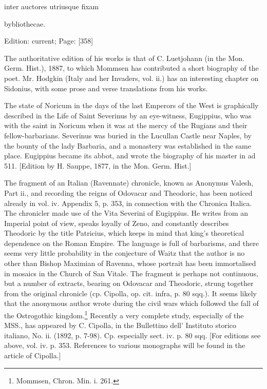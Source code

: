 inter auctores utriusque fixam

bybliothecae.

Edition: current; Page: [358]

The authoritative edition of his works is that of C. Luetjohann (in the Mon. Germ. Hist.), 1887, to which Mommsen has contributed a short biography of the poet. Mr. Hodgkin (Italy and her Invaders, vol. ii.) has an interesting chapter on Sidonius, with some prose and verse translations from his works.

The state of Noricum in the days of the last Emperors of the West is graphically described in the Life of Saint Severinus by an eye-witness, Eugippius, who was with the saint in Noricum when it was at the mercy of the Rugians and their fellow-barbarians. Severinus was buried in the Lucullan Castle near Naples, by the bounty of the lady Barbaria, and a monastery was established in the same place. Eugippius became its abbot, and wrote the biography of his master in ad 511. [Edition by H. Sauppe, 1877, in the Mon. Germ. Hist.]

The fragment of an Italian (Ravennate) chronicle, known as Anonymus Valesh, Part ii., and recording the reigns of Odovacar and Theodoric, has been noticed already in vol. iv. Appendix 5, p. 353, in connection with the Chronica Italica. The chronicler made use of the Vita Severini of Eugippius. He writes from an Imperial point of view, speaks loyally of Zeno, and constantly describes Theodoric by the title Patricius, which keeps in mind that king\texthebrew{}’s theoretical dependence on the Roman Empire. The language is full of barbarisms, and there seems very little probability in the conjecture of Waitz that the author is no other than Bishop Maximian of Ravenna, whose portrait has been immortalised in mosaics in the Church of San Vitale. The fragment is perhaps not continuous, but a number of extracts, bearing on Odovacar and Theodoric, strung together from the original chronicle (cp. Cipolla, op. cit. infra, p. 80 sqq.). It seems likely that the anonymous author wrote during the civil wars which followed the fall of the Ostrogothic kingdom.\footnote{Mommsen, Chron. Min. i. 261.} Recently a very complete study, especially of the MSS., has appeared by C. Cipolla, in the Bullettino dell\texthebrew{}’ Instituto storico italiano, No. ii. (1892, p. 7-98). Cp. especially sect. iv. p. 80 sqq. [For editions see above, vol. iv. p. 353. References to various monographs will be found in the article of Cipolla.]

